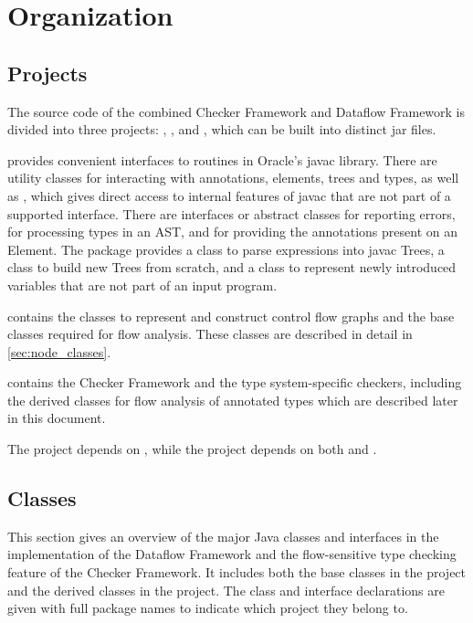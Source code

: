 \section{Organization}

\subsection{Projects}

The source code of the combined Checker Framework and Dataflow Framework is divided into three projects: , , and , which can be built into distinct jar files. 

 provides convenient interfaces to routines in Oracle's javac library.  There are utility classes for interacting with annotations, elements, trees and types, as well as , which gives direct access to internal features of javac that are not part of a supported interface.  There are interfaces or abstract classes for reporting errors, for processing types in an AST, and for providing the annotations present on an Element.  The  package provides a class to parse expressions into javac Trees, a class to build new Trees from scratch, and a class to represent newly introduced variables that are not part of an input program.
 
 contains the classes to represent and construct control flow graphs and the base classes required for flow analysis.   These classes are described in detail in \autoref{sec:node_classes}.
  
 contains the Checker Framework and the type system-specific checkers, including the derived classes for flow analysis of annotated types which are described later in this document.

The  project depends on , while the  project depends on both  and .

\subsection{Classes}

This section gives an overview of the major Java classes and interfaces in the implementation of the Dataflow Framework and the flow-sensitive type checking feature of the Checker Framework.  It includes both the base classes in the  project and the derived classes in the  project.  The class and interface declarations are given with full package names to indicate which project they belong to.

